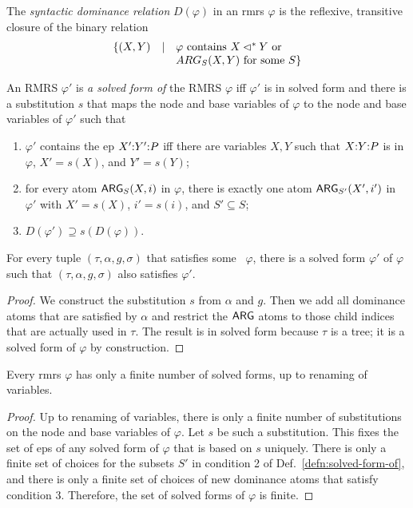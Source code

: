 \begin{definition} \label{defn:solved-form-of} The \emph{syntactic
    dominance relation} $D(\varphi)$ in an {\sc rmrs} $\varphi$ is the
  reflexive, transitive closure of the binary relation $$
\begin{array}{r c l}
\{(X,Y) & \mid &  \mbox{$\varphi$ contains $X \lhd^* Y$ or}\\
&& \mbox{$ARG_S(X,Y)$ for some
    $S$}\}
\end{array}
$$  


  An RMRS $\varphi'$ is \emph{a solved form of} the RMRS $\varphi$
  iff $\varphi'$ is in solved form and there is a substitution $s$
  that maps the  node and base variables of $\varphi$ to the node and
  base variables of $\varphi'$ such that
  \begin{enumerate}
  \item $\varphi'$ contains the {\sc ep} $X' {:} Y' {:} P$ iff there are
    variables $X,Y$ such that $X {:} Y {:} P$ is in $\varphi$, $X' =
    s(X)$, and $Y' = s(Y)$;
  \item for every atom $\mathsf{ARG}_S(X,i)$ in $\varphi$, there is exactly
    one atom $\mathsf{ARG}_{S'}(X',i')$ in $\varphi'$ with $X' = s(X)$, $i' =
    s(i)$, and $S' \subseteq S$;
  \item $D(\varphi') \supseteq s(D(\varphi))$.
  \end{enumerate}
\end{definition}

\begin{prop} \label{prop:models-satisfy-solved-forms}
  For every tuple $(\tau,\alpha,g,\sigma)$ that satisfies some \rmrs\
  $\varphi$, there is a solved form $\varphi'$ of $\varphi$ such that
  $(\tau,\alpha,g,\sigma)$ also satisfies $\varphi'$.
\end{prop}
\begin{proof}
  We construct the substitution $s$ from $\alpha$ and $g$.  Then we
  add all dominance atoms that are satisfied by $\alpha$ and restrict
  the $\mathsf{ARG}$ atoms to those child indices that are actually used in
  $\tau$.  The result is in solved form because $\tau$ is a tree; it
  is a solved form of $\varphi$ by construction.
\end{proof}

\begin{prop}  \label{prop:finite-solved-forms}
  Every {\sc rmrs} $\varphi$ has only a finite number of solved forms, up to
  renaming of variables.
\end{prop}
\begin{proof}
  Up to renaming of variables, there is only a finite number of
  substitutions on the node and base variables of $\varphi$.  Let $s$
  be such a substitution.  This fixes the set of {\sc ep}s of any
  solved form of $\varphi$ that is based on $s$ uniquely.  There is
  only a finite set of choices for the subsets $S'$ in condition 2 of
  Def.~\ref{defn:solved-form-of}, and there is only a finite set of
  choices of new dominance atoms that satisfy condition 3.  Therefore,
  the set of solved forms of $\varphi$ is finite.
\end{proof}

